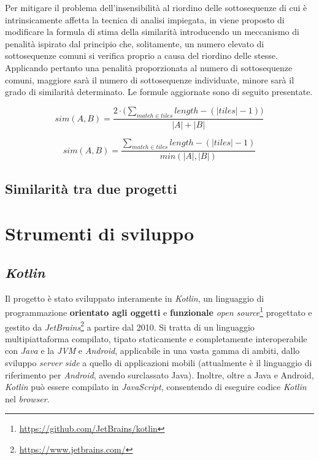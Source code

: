Per mitigare il problema dell'insensibilità al riordino delle sottosequenze di cui è intrinsicamente affetta la tecnica di analisi impiegata, in \cite{es-plag} viene proposto di modificare la formula di stima della similarità introducendo un meccanismo di penalità ispirato dal principio che, solitamente, un numero elevato di sottosequenze comuni si verifica proprio a causa del riordino delle stesse. 
%
Applicando pertanto una penalità proporzionata al numero di sottosequenze comuni, maggiore sarà il numero di sottosequenze individuate, minore sarà il grado di similarità determinato.
%
Le formule aggiornate sono di seguito presentate.

\begin{equation}
	sim(A, B) = \frac{2 \cdot \bigl( \sum_{match \in tiles} length - (|tiles|-1) \bigr)}{|A|+|B|}
\end{equation}

\begin{equation}
	sim(A, B) = \frac{\sum_{match \in tiles} length - (|tiles|-1)}{min(|A|, |B|)}
\end{equation} 

\subsection*{Similarità tra due progetti}

\section{Strumenti di sviluppo}

\subsection*{\textit{Kotlin}}
Il progetto è stato sviluppato interamente in \textit{Kotlin}, un linguaggio di programmazione \textbf{orientato agli oggetti} e \textbf{funzionale} \textit{open source}\footnote{\url{https://github.com/JetBrains/kotlin}} progettato e gestito da \textit{JetBrains}\footnote{\url{https://www.jetbrains.com/}} a partire dal 2010.
%
Si tratta di un linguaggio multipiattaforma compilato, tipato staticamente e  completamente interoperabile con \textit{Java} e la \textit{JVM} e \textit{Android}, applicabile in una vasta gamma di ambiti, dallo sviluppo \textit{server side} a quello di applicazioni mobili (attualmente è il linguaggio di riferimento per \textit{Android}, avendo surclassato Java).
%
Inoltre, oltre a Java e Android, \textit{Kotlin} può essere compilato in \textit{JavaScript}, consentendo di eseguire codice \textit{Kotlin} nel \textit{browser}.

